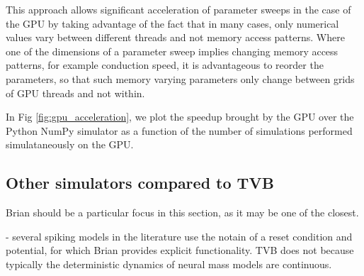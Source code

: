 	This approach allows significant acceleration of parameter sweeps in the
	case of the GPU by taking
	advantage of the fact that in many cases, only numerical values vary
	between different threads and not memory access patterns. Where one of the
	dimensions of a parameter sweep implies changing memory access patterns, 
	for example conduction speed, it is advantageous to reorder the parameters,
	so that such memory varying parameters only change between grids of GPU
	threads and not within.

	In Fig \ref{fig:gpu_acceleration}, we plot the speedup brought by the GPU
	over the Python NumPy simulator as a function of the number of simulations 
	performed simulataneously on the GPU.


\subsection{Other simulators compared to TVB}

	Brian should be a particular focus in this section, as it may
	be one of the closest. 

	- several spiking models in the literature use the notain of a reset
		condition and potential, for which Brian provides explicit
		functionality. TVB does not because typically the deterministic
		dynamics of neural mass models are continuous.
